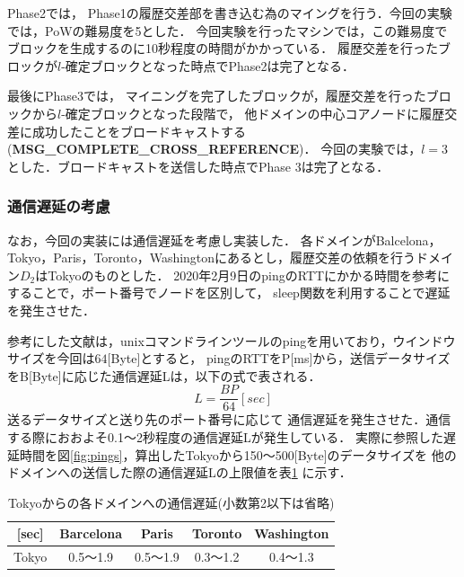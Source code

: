 \documentclass[a4paper,12pt]{jsarticle}
\begin{document}
Phase2では，
Phase1の履歴交差部を書き込む為のマイングを行う．今回の実験では，PoWの難易度を5とした．
今回実験を行ったマシンでは，この難易度でブロックを生成するのに10秒程度の時間がかかっている．
履歴交差を行ったブロックが$l$-確定ブロックとなった時点でPhase2は完了となる．

最後にPhase3では，
マイニングを完了したブロックが，履歴交差を行ったブロックから$l$-確定ブロックとなった段階で，
他ドメインの中心コアノードに履歴交差に成功したことをブロードキャストする
 (\textbf{MSG\_COMPLETE\_CROSS\_REFERENCE})．
今回の実験では，$l=3$とした．ブロードキャストを送信した時点でPhase 3は完了となる．



\subsubsection{通信遅延の考慮}

なお，今回の実装には通信遅延を考慮し実装した．
各ドメインがBalcelona，Tokyo，Paris，Toronto，Washingtonにあるとし，履歴交差の依頼を行うドメイン$D_2$はTokyoのものとした．
2020年2月9日のpingのRTTにかかる時間\cite{pings}を参考にすることで，ポート番号でノードを区別して，
sleep関数を利用することで遅延を発生させた．

参考にした文献\cite{pings}は，unixコマンドラインツールのpingを用いており，ウインドウサイズを今回は$64$[Byte]とすると，
pingのRTTをP[ms]から，送信データサイズをB[Byte]に応じた通信遅延Lは，以下の式で表される．
\begin{equation}
  \label{byt}
    L = \frac{BP}{64} [sec]
\end{equation}
送るデータサイズと送り先のポート番号に応じて
通信遅延を発生させた．通信する際におおよそ0.1〜2秒程度の通信遅延Lが発生している．
実際に参照した遅延時間を図\ref{fig:pings}，算出したTokyoから150〜500[Byte]のデータサイズを
他のドメインへの送信した際の通信遅延Lの上限値を表\ref{Byte} に示す．

\begin{table}[H]%
  \centering
  \caption{Tokyoからの各ドメインへの通信遅延(小数第2以下は省略)}
  \label{Byte}
  \begin{tabular}{c|c|c|c|c|}
  \cline{2-5}
  [sec]                       & Barcelona &    Paris   &   Toronto  & Washington \\ \hline
  \multicolumn{1}{|c|}{Tokyo} &  0.5〜1.9 &  0.5〜1.9  &  0.3〜1.2  &  0.4〜1.3  \\ \hline
  \end{tabular}
\end{table}
\end{document}
